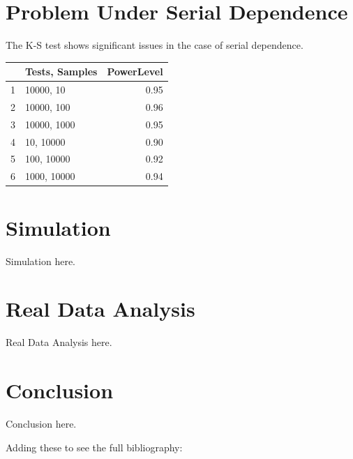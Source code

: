 \documentclass[12pt, letterpaper, titlepage]{article}
\begin{document}
\hypertarget{sec:litrev}{%
\section{Problem Under Serial Dependence}\label{sec:litrev}}

The K-S test shows significant issues in the case of serial dependence.

\begin{table}[ht]
\centering
\begin{tabular}{rlr}
  \hline
 & Tests, Samples & PowerLevel \\ 
  \hline
1 & 10000, 10 & 0.95 \\ 
  2 & 10000, 100 & 0.96 \\ 
  3 & 10000, 1000 & 0.95 \\ 
  4 & 10, 10000 & 0.90 \\ 
  5 & 100, 10000 & 0.92 \\ 
  6 & 1000, 10000 & 0.94 \\ 
   \hline
\end{tabular}
\end{table}

\hypertarget{sec:data}{%
\section{Simulation}\label{sec:data}}

Simulation here.

\hypertarget{sec:methods}{%
\section{Real Data Analysis}\label{sec:methods}}

Real Data Analysis here.

\hypertarget{sec:disc}{%
\section{Conclusion}\label{sec:disc}}

Conclusion here.

Adding these to see the full bibliography: 

\citet{Steinskog}
\citet{Weiss}
\citet{Massey}
\citet{Lilliefors}



\end{document}
